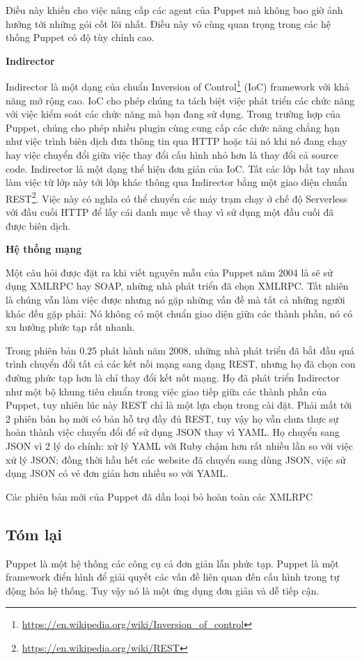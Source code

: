 Điều này khiến cho việc nâng cấp các agent của Puppet mà không bao giờ ảnh hưởng tới những gói cốt lõi nhất. Điều này vô cùng quan trọng trong các hệ thống Puppet có độ tùy chỉnh cao.

\textbf{\large Indirector}

Indirector là một dạng của chuẩn Inversion of Control\footnote{\url{https://en.wikipedia.org/wiki/Inversion_of_control}} (IoC) framework với khả năng mở rộng cao. IoC cho phép chúng ta tách biệt việc phát triển các chức năng với việc kiểm soát các chức năng mà bạn đang sử dụng. Trong trường hợp của Puppet, chúng cho phép nhiều plugin cùng cung cấp các chức năng chẳng hạn như việc trình biên dịch đưa thông tin qua HTTP hoặc tải nó khi nó đang chạy hay việc chuyển đổi giữa việc thay đổi cấu hình nhỏ hơn là thay đổi cả source code. Indirector là một dạng thể hiện đơn giản của IoC. Tất các lớp bắt tay nhau làm việc từ lớp này tới lớp khác thông qua Indirector bằng một giao diện chuẩn REST\footnote{\url{https://en.wikipedia.org/wiki/REST}}. Việc này có nghĩa có thể chuyển các máy trạm chạy ở chế độ Serverless với đầu cuối HTTP để lấy cái danh mục về thay vì sử dụng một đầu cuối đã được biên dịch.

\textbf{\large Hệ thống mạng}


Một câu hỏi được đặt ra khi viết nguyên mẫu của Puppet năm 2004 là sẽ sử dụng XMLRPC hay SOAP, những nhà phát triển đã chọn XMLRPC. Tất nhiên là chúng vẫn làm việc được nhưng nó gặp những vấn đề mà tất cả những người khác đều gặp phải: Nó không có một chuẩn giao diện giữa các thành phần, nó có xu hướng phức tạp rất nhanh.

Trong phiên bản 0.25 phát hành năm 2008, những nhà phát triển đã bắt đầu quá trình chuyển đổi tất cả các kết nối mạng sang dạng REST, nhưng họ đã chọn con đường phức tạp hơn là chỉ thay đổi kết nốt mạng. Họ đã phát triển Indirector như một bộ khung tiêu chuẩn trong việc giao tiếp giữa các thành phần của Puppet, tuy nhiên lúc này REST chỉ là một lựa chọn trong cài đặt. Phải mất tới 2 phiên bản họ mới có bản hỗ trợ đầy đủ REST, tuy vậy họ vẫn chưa thực sự hoàn thành việc chuyển đổi để sử dụng JSON thay vì YAML. Họ chuyển sang JSON vì 2 lý do chính: xử lý YAML với Ruby chậm hơn rất nhiều lần so với việc xử lý JSON; đồng thời hầu hết các website đã chuyển sang dùng JSON, việc sử dụng JSON có vẻ đơn giản hơn nhiều so với YAML.

Các phiên bản mới của Puppet đã dần loại bỏ hoàn toàn các XMLRPC


\subsection*{Tóm lại}

Puppet là một hệ thống các công cụ cả đơn giản lẫn phức tạp. Puppet là một framework điển hình để giải quyết các vấn đề liên quan đến cấu hình trong tự động hóa hệ thống. Tuy vậy nó là một ứng dụng đơn giản và dễ tiếp cận.
